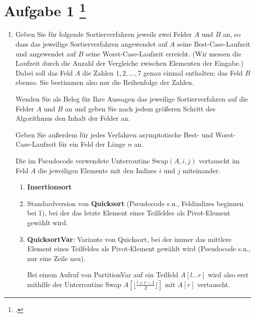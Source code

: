 \documentclass{lehramt-informatik-aufgabe}
\begin{document}
\section{Aufgabe 1
\footcite{66115:2021:03}}

\begin{enumerate}


\item Geben Sie für folgende Sortierverfahren jeweils zwei Felder $A$
und $B$ an, so dass das jeweilige Sortierverfahren angewendet auf $A$
seine Best-Case-Laufzeit und angewendet auf $B$ seine
Worst-Case-Laufzeit erreicht. (Wir messen die Laufzeit durch die Anzahl
der Vergleiche zwischen Elementen der Eingabe.) Dabei soll das Feld $A$
die Zahlen $1,2,\dots,7$ genau einmal enthalten; das Feld $B$ ebenso.
Sie bestimmen also nur die Reihenfolge der Zahlen.

Wenden Sie als Beleg für Ihre Aussagen das jeweilige Sortierverfahren
auf die Felder $A$ und $B$ an und geben Sie nach jedem größeren Schritt
des Algorithmus den Inhalt der Felder an.

Geben Sie außerdem für jedes Verfahren asymptotische Best- und
Worst-Case-Laufzeit für ein Feld der Länge $n$ an.

Die im Pseudocode verwendete Unterroutine $\text{Swap} (A,i,j)$
vertauscht im Feld $A$ die jeweiligen Elemente mit den Indizes $i$ und
$j$ miteinander.
\begin{enumerate}


\item \textbf{Insertionsort}


\item Standardversion von \textbf{Quicksort} (Pseudocode s.u.,
Feldindizes beginnen bei 1), bei der das letzte Element eines Teilfeldes
als Pivot-Element gewählt wird.


\item \textbf{QuicksortVar}: Variante von Quicksort, bei der immer das
mittlere Element eines Teilfeldes als Pivot-Element gewählt wird
(Pseudocode s.u., nur eine Zeile neu).

Bei einem Aufruf von PartitionVar auf ein Teilfeld $A[l \dots r]$ wird
also erst mithilfe der Unterroutine Swap $A\left[\lfloor \frac{l + r - 1}{2} \rfloor\right]$ mit $A[r]$
vertauscht.


\end{enumerate}
\end{enumerate}
\end{document}
